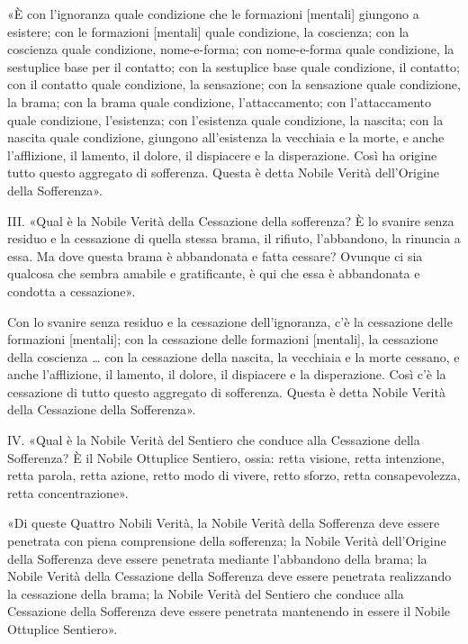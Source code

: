 
«È con l’ignoranza quale condizione che le formazioni [mentali] giungono a
esistere; con le formazioni [mentali] quale condizione, la coscienza; con la
coscienza quale condizione, nome-e-forma; con nome-e-forma quale condizione, la
sestuplice base per il contatto; con la sestuplice base quale condizione, il
contatto; con il contatto quale condizione, la sensazione; con la sensazione
quale condizione, la brama; con la brama quale condizione, l’attaccamento; con
l’attaccamento quale condizione, l’esistenza; con l’esistenza quale condizione,
la nascita; con la nascita quale condizione, giungono all’esistenza la vecchiaia
e la morte, e anche l’afflizione, il lamento, il dolore, il dispiacere e la
disperazione. Così ha origine tutto questo aggregato di sofferenza. Questa è
detta Nobile Verità dell’Origine della Sofferenza».


III. «Qual è la Nobile Verità della Cessazione della sofferenza? È lo svanire
senza residuo e la cessazione di quella stessa brama, il rifiuto, l’abbandono,
la rinuncia a essa. Ma dove questa brama è abbandonata e fatta cessare? Ovunque
ci sia qualcosa che sembra amabile e gratificante, è qui che essa è abbandonata
e condotta a cessazione».


Con lo svanire senza residuo e la cessazione dell’ignoranza, c’è la cessazione
delle formazioni [mentali]; con la cessazione delle formazioni [mentali], la
cessazione della coscienza … con la cessazione della nascita, la vecchiaia e la
morte cessano, e anche l’afflizione, il lamento, il dolore, il dispiacere e la
disperazione. Così c’è la cessazione di tutto questo aggregato di sofferenza.
Questa è detta Nobile Verità della Cessazione della Sofferenza».


IV. «Qual è la Nobile Verità del Sentiero che conduce alla Cessazione della
Sofferenza? È il Nobile Ottuplice Sentiero, ossia: retta visione, retta
intenzione, retta parola, retta azione, retto modo di vivere, retto sforzo,
retta consapevolezza, retta concentrazione».


«Di queste Quattro Nobili Verità, la Nobile Verità della Sofferenza deve essere
penetrata con piena comprensione della sofferenza; la Nobile Verità dell’Origine
della Sofferenza deve essere penetrata mediante l’abbandono della brama; la
Nobile Verità della Cessazione della Sofferenza deve essere penetrata
realizzando la cessazione della brama; la Nobile Verità del Sentiero che conduce
alla Cessazione della Sofferenza deve essere penetrata mantenendo in essere il
Nobile Ottuplice Sentiero».

